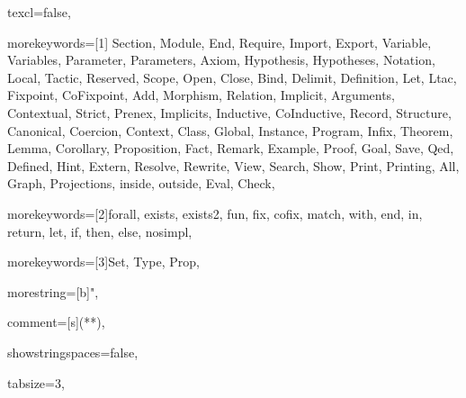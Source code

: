 
 {
texcl=false,

morekeywords=[1]{
Section, Module, End, Require, Import, Export,
Variable, Variables, Parameter, Parameters, Axiom, Hypothesis, Hypotheses,
Notation, Local, Tactic, Reserved, Scope, Open, Close, Bind, Delimit,
Definition, Let, Ltac, Fixpoint, CoFixpoint, Add, Morphism, Relation,
Implicit, Arguments, Contextual, Strict, Prenex, Implicits,
Inductive, CoInductive, Record, Structure, Canonical, Coercion,
Context, Class, Global, Instance, Program, Infix,
Theorem, Lemma, Corollary, Proposition, Fact, Remark, Example,
Proof, Goal, Save, Qed, Defined, Hint, Extern, Resolve, Rewrite, View,
Search, Show, Print, Printing, All, Graph, Projections, inside, outside, Eval,
Check},

morekeywords=[2]{forall, exists, exists2, fun, fix, cofix,
      match, with, end, %
      in, return, let, %
      if, then, else,
      nosimpl},

morekeywords=[3]{Set, Type, Prop},





morestring=[b]{"},

comment=[s]{(*}{*)},

showstringspaces=false,

tabsize=3,							

}
